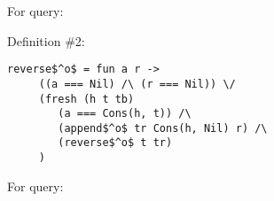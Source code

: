\begin{enumerate}
For query:


Definition \#2:

\begin{lstlisting}[basicstyle=\small]
   reverse$^o$ = fun a r ->
     ((a === Nil) /\ (r === Nil)) \/
     (fresh (h t tb)
        (a === Cons(h, t)) /\
        (append$^o$ tr Cons(h, Nil) r) /\
        (reverse$^o$ t tr)
     )
\end{lstlisting}

For query:


\end{enumerate} 